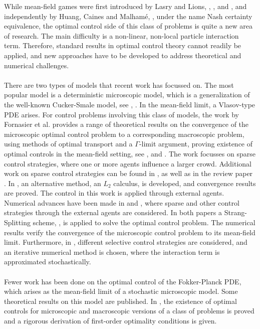 
While mean-field games were first introduced by Lasry and Lions, \cite{LASRY2006619}, \cite{LASRY2006679},\cite{LASRY4} and \cite{Lasry2007}, and independently by Huang, Caines and Malham\'e,  \cite{Huang1}, under the name Nash certainty equivalence, the optimal control side of this class of problems is quite a new area of research. The main difficulty is a non-linear, non-local particle interaction term. Therefore, standard results in optimal control theory cannot readily be applied, and new approaches have to be developed to address theoretical and numerical challenges.
\\
\\
There are two types of models that recent work has focussed on. The most popular model is a deterministic microscopic model, which is a generalization of the well-known Cucker-Smale model, see \cite{CuckerSmale1}, \cite{CuckerSmale2}. In the mean-field limit, a Vlasov-type PDE arises. For control problems involving this class of models, the work by Fornasier et al. provides a range of theoretical results on the convergence of the microscopic optimal control problem to a corresponding macroscopic problem, using methods of optimal transport and a $\Gamma$-limit argument, proving existence of optimal controls in the mean-field setting, see \cite{Fornasier_2014},
\cite{Fornasier_2014no2}
and \cite{fornasier_lisini_orrieri_savare_2019}. The work focusses on sparse control strategies, where one or more agents influence a larger crowd.
Additional work on sparse control strategies can be found in \cite{piccoli2014no1}, as well as in the review paper \cite{Fornasier_20161no1}.
In \cite{burger2019meanfield}, an alternative method, an $L_2$ calculus, is developed, and convergence results are proved. The control in this work is applied through external agents. 
\\
Numerical advances have been made in \cite{burger2019instantaneous} and \cite{burger2016controlling}, where sparse and other control strategies through the external agents are considered. In both papers a Strang-Splitting scheme, \cite{ChengC.Z1976Tiot}, is applied to solve the optimal control problem. The numerical results verify the convergence of the microscopic control problem to its mean-field limit.
Furthermore, in \cite{albi2016selective}, different selective control strategies are considered, and an iterative numerical method is chosen, where the interaction term is approximated stochastically.
\\
\\
Fewer work has been done on the optimal control of the Fokker-Planck PDE, which arises as the mean-field limit of a stochastic microscopic model. Some theoretical results on this model are published. In \cite{albi2016mean}, the existence of optimal controls for microscopic and macroscopic versions of a class of problems is proved and a rigorous derivation of first-order optimality conditions is given. 

